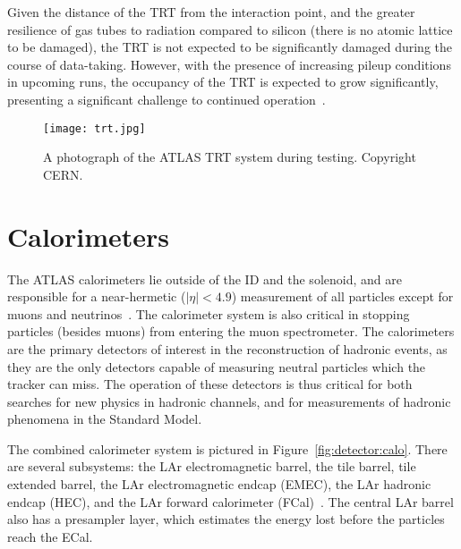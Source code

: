 Given the distance of the TRT from the interaction point, and the greater resilience of gas tubes to radiation compared to silicon (there is no atomic lattice to be damaged), the TRT is not expected to be significantly damaged during the course of data-taking. However, with the presence of increasing pileup conditions in upcoming runs, the occupancy of the TRT is expected to grow significantly, presenting a significant challenge to continued operation~\cite{TRTOccupancy}.


\begin{figure}
\centering
\texttt{[image: trt.jpg]}
\label{fig:detector:trt}
\caption{A photograph of the ATLAS TRT system during testing. Copyright CERN.}
\end{figure}


\section{Calorimeters}

The ATLAS calorimeters lie outside of the ID and the solenoid, and are responsible for a near-hermetic ($|\eta| < 4.9$) measurement of all particles except for muons and neutrinos~\cite{ATLASPaper}.  The calorimeter system is also critical in stopping particles (besides muons) from entering the muon spectrometer. The calorimeters are the primary detectors of interest in the reconstruction of hadronic events, as they are the only detectors capable of measuring neutral particles which the tracker can miss. The operation of these detectors is thus critical for both searches for new physics in hadronic channels, and for measurements of hadronic phenomena in the Standard Model.

The combined calorimeter system is pictured in Figure~\ref{fig:detector:calo}. There are several subsystems: the LAr electromagnetic barrel, the tile barrel, tile extended barrel, the LAr electromagnetic endcap (EMEC), the LAr hadronic endcap (HEC), and the LAr forward calorimeter (FCal)~\cite{ATLASPaper}. The central LAr barrel also has a presampler layer, which estimates the energy lost before the particles reach the ECal.

